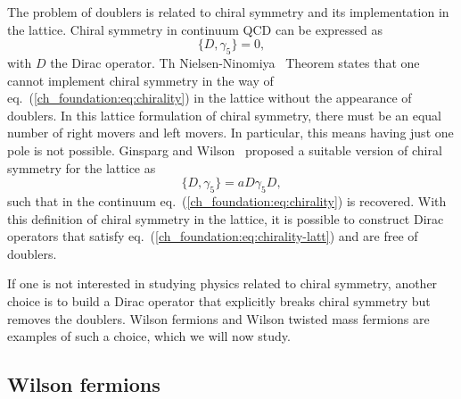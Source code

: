 The problem of doublers is related to chiral symmetry and its implementation in the lattice. Chiral symmetry in continuum QCD can be expressed as 
\begin{equation}
\label{ch_foundation:eq:chirality}
\{D,\gamma_5\}=0,
\end{equation}
with $D$ the Dirac operator. Th Nielsen-Ninomiya~\citep{Nielsen:1980rz,Nielsen:1981hk} Theorem states that one cannot implement chiral symmetry in the way of eq.~(\ref{ch_foundation:eq:chirality}) in the lattice without the appearance of doublers. In this lattice formulation of chiral symmetry, there must be an equal number of right movers and left movers. In particular, this means having just one pole is not possible. Ginsparg and Wilson~\citep{Ginsparg:1981bj} proposed a suitable version of chiral symmetry for the lattice as
\begin{equation}
\label{ch_foundation:eq:chirality-latt}
\{D,\gamma_5\}=aD\gamma_5D,
\end{equation}
such that in the continuum eq.~(\ref{ch_foundation:eq:chirality}) is recovered. With this definition of chiral symmetry in the lattice, it is possible to construct Dirac operators that satisfy eq.~(\ref{ch_foundation:eq:chirality-latt}) and are free of doublers. 

If one is not interested in studying physics related to chiral symmetry, another choice is to build a Dirac operator that explicitly breaks chiral symmetry but removes the doublers. Wilson fermions and Wilson twisted mass fermions are examples of such a choice, which we will now study.


\subsection{Wilson fermions}
\label{ch_foundation:subsec:Wilson}

